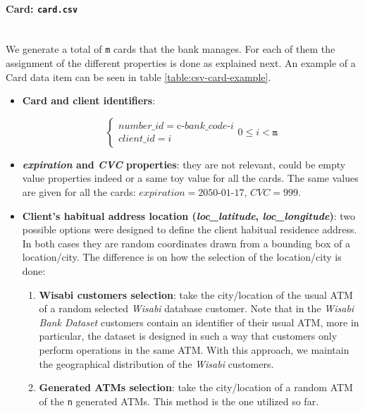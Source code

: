 \paragraph{Card: \texttt{card.csv}\\\\}

\noindent
We generate a total of \texttt{m} cards that the bank manages. For each of them the assignment of the different properties is done as explained next. An example of a Card data item can be seen in table \ref{table:csv-card-example}.

\begin{itemize}
\item \textbf{Card and client identifiers}:

\[
\begin{cases} 
number\_id = \text{c-}bank\_code\text{-}i \\
client\_id = i 
\end{cases}
0 \leq i < \texttt{m}
\]

\item \textbf{\emph{expiration} and \emph{CVC} properties}: they are not relevant, could be empty value properties indeed or a same toy value for all the cards. The same values are given for all the cards: $expiration = \text{2050-01-17}$, $CVC = 999$.

\item \textbf{Client's habitual address location (\emph{loc\_latitude}, \emph{loc\_longitude})}: two possible options were designed to define the client habitual residence address. In both 
cases they are random 
coordinates drawn from a bounding box of a location/city. The difference is on how the selection of the location/city is done:

  \begin{enumerate}
      \item \textbf{Wisabi customers selection}: take the city/location of the usual ATM of a random selected \emph{Wisabi} database customer. Note that in the \emph{Wisabi Bank Dataset} customers contain an identifier
      of their usual ATM, more in particular, the dataset is designed in such a way that customers
      only perform operations in the same ATM.
      With this approach, we maintain the geographical distribution of the \emph{Wisabi} customers.
      \item \textbf{Generated ATMs selection}: take the city/location of a random ATM of the \texttt{n} generated ATMs. This method is the one utilized so far.
  \end{enumerate}


\end{itemize}

